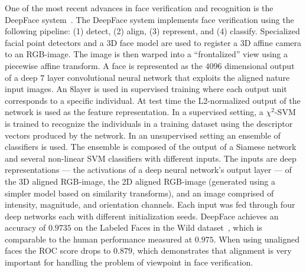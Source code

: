         One of the most recent advances in face verification and recognition is the DeepFace
          system~\cite{taigman_deepface_2014}.
        The DeepFace system implements face verification using the following pipeline:
        (1) detect,
        (2) align,
        (3) represent, and
        (4) classify.
        Specialized facial point detectors and a 3D face model are used to register a 3D affine camera to an
          RGB-image.
        The image is then warped into a ``frontalized'' view using a piecewise affine transform.
        A face is represented as the $4096$ dimensional output of a deep $7$ layer convolutional neural network
          that exploits the aligned nature input images.
        An $8$\th layer is used in supervised training where each output unit corresponds to a specific
          individual.
        At test time the L2-normalized output of the network is used as the feature representation.
        In a supervised setting, a $\chi^2$-SVM is trained to recognize the individuals in a training dataset
          using the descriptor vectors produced by the network.
        In an unsupervised setting an ensemble of classifiers is used.
        The ensemble is composed of the output of a Siamese network~\cite{chopra_learning_2005} and several
          non-linear SVM classifiers with different inputs.
        The inputs are deep representations --- the activations of a deep neural network's output layer --- of
          the 3D aligned RGB-image, the 2D aligned RGB-image (generated using a simpler model based on similarity
          transforms), and an image comprised of intensity, magnitude, and orientation channels.
        Each input was fed through four deep networks each with different initialization seeds.
        DeepFace achieves an accuracy of $0.9735$ on the Labeled Faces in the Wild
          dataset~\cite{huang_labeled_2007}, which is comparable to the human performance measured at $0.975$.
        When using unaligned faces the ROC score drops to $0.879$, which demonstrates that alignment is very
          important for handling the problem of viewpoint in face verification.

